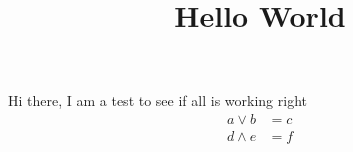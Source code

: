 \documentclass{article}
\title{Hello World}
\begin{document}
	\maketitle
	Hi there, I am a test to see if all is working right
	\begin{align}
		a \vee b &= c\\
		d \wedge e &= f
	\end{align}
\end{document}
